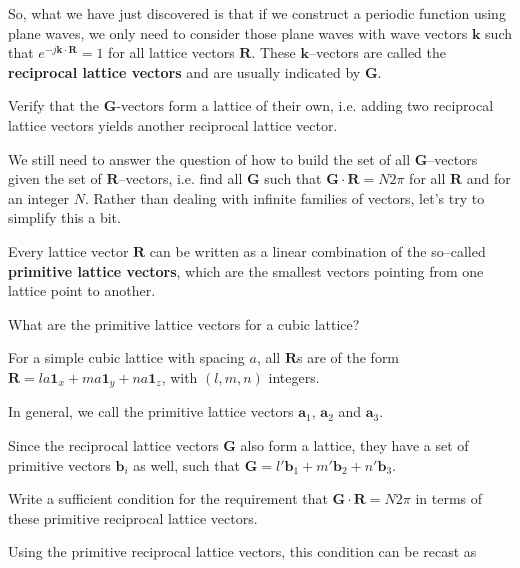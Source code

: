 So, what we have just discovered is that if we construct a periodic function using plane waves, we only need to consider those plane waves with wave vectors ${\mathbf k}$ such that $e ^ {-j {\mathbf k} \cdot {\mathbf R}} = 1$ for all lattice vectors ${\mathbf R}$. These ${\mathbf k}$--vectors are called the \textbf{reciprocal lattice vectors} and are usually indicated by ${\mathbf G}$.

\begin{exer}
Verify that the  ${\mathbf G}$-vectors form a lattice of their own, i.e. adding two reciprocal lattice vectors yields another reciprocal lattice vector.
\end{exer}

We still need to answer the question of how to build the set of all ${\mathbf G}$--vectors given the set of ${\mathbf R}$--vectors, i.e. find all ${\mathbf G}$ such that ${\mathbf G} \cdot {\mathbf R} = N 2 \pi$ for all ${\mathbf R}$ and for an integer $N$. Rather than dealing with infinite families of vectors, let's try to simplify this a bit.

Every lattice vector ${\mathbf R}$ can be written as a linear combination of the so--called \textbf{primitive lattice vectors}, which are the smallest vectors pointing from one lattice point to another.

\begin{cue}
  What are the primitive lattice vectors for a cubic lattice?
\end{cue}

For a simple cubic lattice with spacing $a$, all ${\mathbf R}$s are of the form ${\mathbf R} = la {\mathbf 1}_x + ma {\mathbf 1}_y + na {\mathbf 1}_z$, with $(l,m,n)$ integers.

In general, we call the primitive lattice vectors ${\mathbf a}_1$, ${\mathbf a}_2$ and ${\mathbf a}_3$.

Since the reciprocal lattice vectors ${\mathbf G}$ also form a lattice, they have a set of primitive vectors ${\mathbf b}_i$ as well, such that ${\mathbf G} = l' {\mathbf b}_1 + m' {\mathbf b}_2 + n' {\mathbf b}_3$.

\begin{cue}
Write a sufficient condition for the requirement that ${\mathbf G} \cdot {\mathbf R} = N 2 \pi$ in terms of these primitive reciprocal lattice vectors.
\end{cue}

Using the primitive reciprocal lattice vectors, this condition can be recast as

